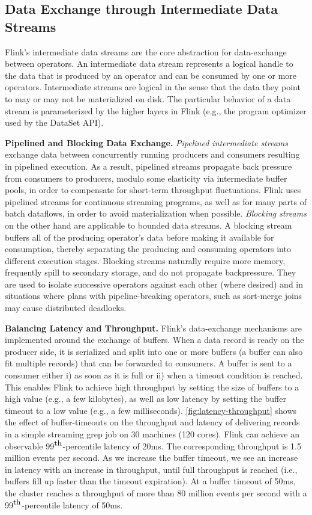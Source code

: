 \documentclass[11pt]{article}
\newcommand{\para}[1]{\vspace{2mm}\noindent\textbf{#1}}
\begin{document}
\subsection{Data Exchange through Intermediate Data Streams}
Flink's intermediate data streams are the core abstraction for data-exchange between operators. An intermediate data stream represents a logical handle to the data that is produced by an operator and can be consumed by one or more operators. Intermediate streams are logical in the sense that the data they point to may or may not be materialized on disk. The particular behavior of a data stream is parameterized by the higher layers in Flink (e.g., the program optimizer used by the DataSet API). 


\para{Pipelined and Blocking Data Exchange.} \emph{Pipelined intermediate streams} exchange data between concurrently running producers and consumers resulting in pipelined execution. As a result, pipelined streams propagate back pressure from consumers to producers, modulo some elasticity via intermediate buffer pools, in order to compensate for short-term throughput fluctuations. Flink uses pipelined streams for continuous streaming programs, as well as for many parts of batch dataflows, in order to avoid materialization when possible. \emph{Blocking streams} on the other hand are applicable to bounded data streams. A blocking stream buffers all of the producing operator's data before making it available for consumption, thereby separating the producing and consuming operators into different execution stages. Blocking streams naturally require more memory, frequently spill to secondary storage, and do not propagate backpressure. They are used to isolate successive operators against each other (where desired) and in situations where plans with pipeline-breaking operators, such as sort-merge joins may cause distributed deadlocks.

\para{Balancing Latency and Throughput.} Flink's data-exchange mechanisms are implemented around the exchange of buffers. When a data record is ready on the producer side, it is serialized and split into one or more buffers (a buffer can also fit multiple records) that can be forwarded to consumers. A buffer is sent to a consumer either i) as soon as it is full or ii) when a timeout condition is reached. This enables Flink to achieve high throughput by setting the size of buffers to a high value (e.g., a few kilobytes), as well as low latency by setting the buffer timeout to a low value (e.g., a few milliseconds). \autoref{fig:latency-throughput} shows the effect of buffer-timeouts on the throughput and latency of delivering records in a simple streaming grep job on 30 machines (120 cores). Flink can achieve an observable 99$^{\mbox{\small{th}}}$-percentile latency of 20ms. The corresponding throughput is 1.5 million events per second. As we increase the buffer timeout, we see an increase in latency with an increase in throughput, until full throughput is reached (i.e., buffers fill up faster than the timeout expiration). At a buffer timeout of 50ms, the cluster reaches a throughput of more than 80 million events per second with a 99$^{\mbox{\small{th}}}$-percentile latency of 50ms.
\end{document}
